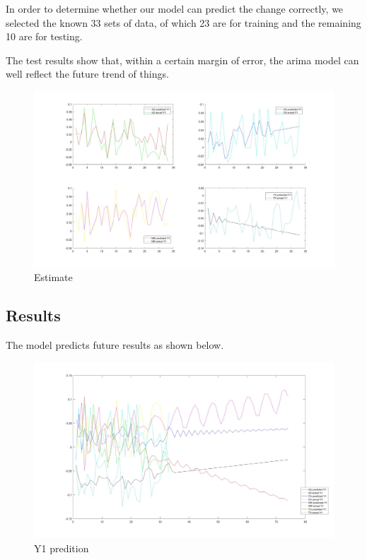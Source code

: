 \documentclass{mcmthesis}
\begin{document}
\begin{enumerate}
        In order to determine whether our model can predict the change correctly, we selected the known 33 sets of data, of which 23 are for training and the remaining 10 are for testing.

        The test results show that, within a certain margin of error, the arima model can well reflect the future trend of things.

        \begin{figure}[!hbpt]
            \centering
            \includegraphics[width=450px]{estimate.jpg}
            \caption{Estimate}
        \end{figure}

    \subsection{Results}

        The model predicts future results as shown below.

        \begin{figure}[!hbpt]
          \centering
          \includegraphics[width=450px]{Y1.jpg}
          \caption{Y1 predition}
        \end{figure}


\end{enumerate}
\end{document}

